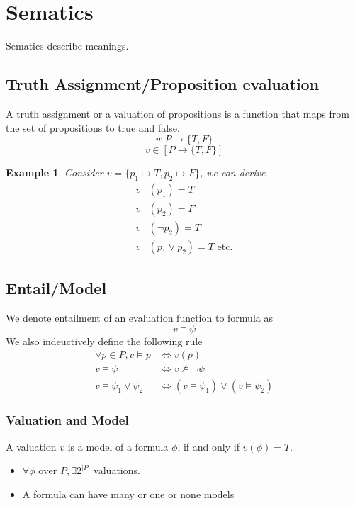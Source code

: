 \documentclass{article}
\newtheorem{example}[theorem]{Example}
\newtheorem{definition}[theorem]{Definition}
\let\olddefinition\definition
\let\endolddefinition\enddefinition
\renewenvironment{definition}
  {\begin{tcolorbox}[
      colback=red!10,
      colframe=red!50!black,
      boxrule=0.6pt,
      arc=2pt,
      left=6pt,right=6pt,top=4pt,bottom=4pt,
      breakable
    ]\olddefinition}
  {\endolddefinition\end{tcolorbox}}
\begin{document}
\section{Sematics}
\begin{definition}
    Sematics describe meanings.
\end{definition}
\subsection{Truth Assignment/Proposition evaluation}
A truth assignment or a valuation of propositions is a function that maps from the set of propositions to true and false.
\[v: P \rightarrow \{T, F\}\]
\[v \in [P \rightarrow \{T, F\}]\]
\begin{example}
    Consider $v = \{p_1 \mapsto T, p_2 \mapsto F\}$, we can derive
    \begin{align*}
    v&(p_1) = T\\
    v&(p_2)= F\\
    v&(\neg p_2) = T\\
    v&(p_1\lor p_2) = T \text{ etc.}
    \end{align*}
\end{example}
\subsection{Entail/Model}
We denote entailment of an evaluation function to formula as 
\[v \models \psi\]
We also indeuctively define the following rule 
\begin{align*}
    \forall p \in P, v\models p &\iff v(p)\\
     v\models \psi &\iff v\nvDash \neg \psi\\
     v \models \psi_1 \lor \psi_2 &\iff (v\models \psi_1) \lor (v\models \psi_2)
\end{align*}
\subsubsection{Valuation and Model}
A valuation $v$ is a model of a formula $\phi$, if and only if $v(\phi) = T$. 
\begin{itemize}
    \item $\forall \phi \text{ over } P, \exists 2^{|P|}$ valuations.
    \item A formula can have many or one or none models 
\end{itemize}
\end{document}
